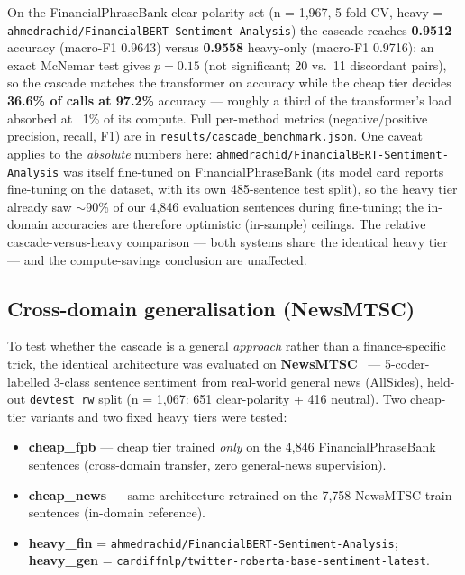 \documentclass{article}
\begin{document}
On the FinancialPhraseBank clear-polarity set (n = 1,967, 5-fold CV, heavy =
\texttt{ahmedrachid/\allowbreak FinancialBERT-Sentiment-Analysis}) the cascade reaches
\textbf{0.9512} accuracy (macro-F1 0.9643) versus \textbf{0.9558} heavy-only
(macro-F1 0.9716): an exact McNemar test gives $p = 0.15$ (not significant; 20
vs.\ 11 discordant pairs), so
the cascade matches the transformer on accuracy while the cheap tier decides
\textbf{36.6\% of calls at 97.2\%} accuracy --- roughly a third of the
transformer's load absorbed at ~1\% of its compute. Full per-method metrics
(negative/positive precision, recall, F1) are in \texttt{results/cascade\_benchmark.json}.
One caveat applies to the \emph{absolute} numbers here:
\texttt{ahmedrachid/\allowbreak FinancialBERT-Sentiment-Analysis} was itself fine-tuned on
FinancialPhraseBank (its model card reports fine-tuning on the dataset, with its
own 485-sentence test split), so the heavy tier already saw $\sim$90\% of our
4{,}846 evaluation sentences during fine-tuning; the in-domain accuracies are
therefore optimistic (in-sample) ceilings. The relative cascade-versus-heavy
comparison --- both systems share the identical heavy tier --- and the
compute-savings conclusion are unaffected.

\subsection{Cross-domain generalisation (NewsMTSC)}

To test whether the cascade is a general \emph{approach} rather than a
finance-specific trick, the identical architecture was evaluated on
\textbf{NewsMTSC}~\citep{hamborg2021} --- 5-coder-labelled 3-class sentence
sentiment from real-world general news (AllSides), held-out \texttt{devtest\_rw}
split (n = 1,067: 651 clear-polarity + 416 neutral). Two cheap-tier variants and
two fixed heavy tiers were tested:

\begin{itemize}
\item \textbf{cheap\_fpb} --- cheap tier trained \emph{only} on the 4,846
  FinancialPhraseBank sentences (cross-domain transfer, zero general-news
  supervision).
\item \textbf{cheap\_news} --- same architecture retrained on the 7,758
  NewsMTSC train sentences (in-domain reference).
\item \textbf{heavy\_fin} = \texttt{ahmedrachid/\allowbreak FinancialBERT-Sentiment-Analysis};
  \textbf{heavy\_gen} = \texttt{cardiffnlp/twitter-roberta-base-sentiment-latest}.
\end{itemize}
\end{document}
